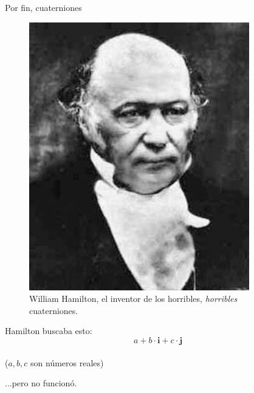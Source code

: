 \documentclass[10pt]{beamer}
\def\R{\mathbb{R}}
\begin{document}
\begin{frame}{Por fin, cuaterniones}

\begin{figure}  		
  	\centering
	\includegraphics[scale=0.35]{images/hamilton_cara.png}
	\caption*{William Hamilton, el inventor de los horribles, \textit{horribles} cuaterniones.}
\end{figure} \pause

	
	
Hamilton buscaba esto:
	$$a +b\cdot \textbf{i} + c \cdot \textbf{j}$$ \\
	
	($a,b,c$ son números reales) \pause
	
	...pero no funcionó.

\end{frame}
\end{document}
